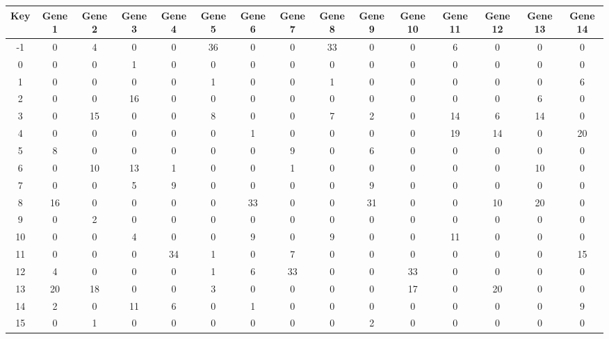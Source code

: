 \begin{tabular}{|c|c|c|c|c|c|c|c|c|c|c|c|c|c|c|}
\hline
Key & Gene 1 & Gene 2 & Gene 3 & Gene 4 & Gene 5 & Gene 6 & Gene 7 & Gene 8 & Gene 9 & Gene 10 & Gene 11 & Gene 12 & Gene 13 & Gene 14 \\
\hline
-1 & 0 & 4 & 0 & 0 & 36 & 0 & 0 & 33 & 0 & 0 & 6 & 0 & 0 & 0 \\
0 & 0 & 0 & 1 & 0 & 0 & 0 & 0 & 0 & 0 & 0 & 0 & 0 & 0 & 0 \\
1 & 0 & 0 & 0 & 0 & 1 & 0 & 0 & 1 & 0 & 0 & 0 & 0 & 0 & 6 \\
2 & 0 & 0 & 16 & 0 & 0 & 0 & 0 & 0 & 0 & 0 & 0 & 0 & 6 & 0 \\
3 & 0 & 15 & 0 & 0 & 8 & 0 & 0 & 7 & 2 & 0 & 14 & 6 & 14 & 0 \\
4 & 0 & 0 & 0 & 0 & 0 & 1 & 0 & 0 & 0 & 0 & 19 & 14 & 0 & 20 \\
5 & 8 & 0 & 0 & 0 & 0 & 0 & 9 & 0 & 6 & 0 & 0 & 0 & 0 & 0 \\
6 & 0 & 10 & 13 & 1 & 0 & 0 & 1 & 0 & 0 & 0 & 0 & 0 & 10 & 0 \\
7 & 0 & 0 & 5 & 9 & 0 & 0 & 0 & 0 & 9 & 0 & 0 & 0 & 0 & 0 \\
8 & 16 & 0 & 0 & 0 & 0 & 33 & 0 & 0 & 31 & 0 & 0 & 10 & 20 & 0 \\
9 & 0 & 2 & 0 & 0 & 0 & 0 & 0 & 0 & 0 & 0 & 0 & 0 & 0 & 0 \\
10 & 0 & 0 & 4 & 0 & 0 & 9 & 0 & 9 & 0 & 0 & 11 & 0 & 0 & 0 \\
11 & 0 & 0 & 0 & 34 & 1 & 0 & 7 & 0 & 0 & 0 & 0 & 0 & 0 & 15 \\
12 & 4 & 0 & 0 & 0 & 1 & 6 & 33 & 0 & 0 & 33 & 0 & 0 & 0 & 0 \\
13 & 20 & 18 & 0 & 0 & 3 & 0 & 0 & 0 & 0 & 17 & 0 & 20 & 0 & 0 \\
14 & 2 & 0 & 11 & 6 & 0 & 1 & 0 & 0 & 0 & 0 & 0 & 0 & 0 & 9 \\
15 & 0 & 1 & 0 & 0 & 0 & 0 & 0 & 0 & 2 & 0 & 0 & 0 & 0 & 0 \\
\hline
\end{tabular}